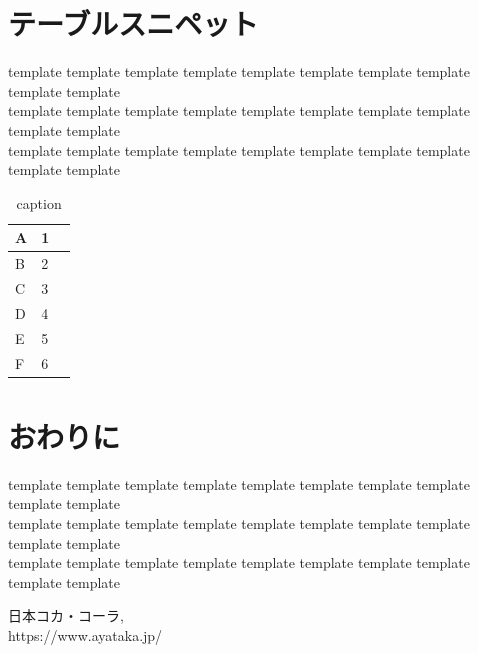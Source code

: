 \documentclass{jarticle}
\begin{document}
\section{テーブルスニペット}
template template template template template template template template template template \\
template template template template template template template template template template \\
template template template template template template template template template template
  \begin{table}[htbp]
    \begin{center}
      \caption{caption}
      \begin{tabular}{|l|l|l|} \hline
        A & 1 \\ \hline
        B & 2 \\ \hline
        C & 3 \\ \hline
        D & 4 \\ \hline
        E & 5 \\ \hline
        F & 6 \\ \hline
      \end{tabular}
      \label{tab:template}
    \end{center}
  \end{table}

\section{おわりに}
template template template template template template template template template template \\
template template template template template template template template template template \\
template template template template template template template template template template

\begin{thebibliography}{9}
  日本コカ・コーラ, \\ https://www.ayataka.jp/
\end{thebibliography}
\end{document}
